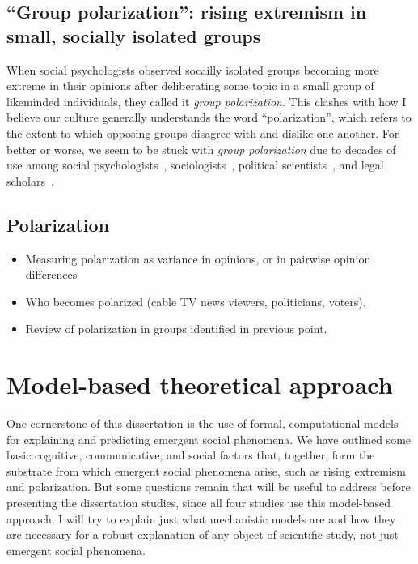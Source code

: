\documentclass[12pt,letterpaper]{article}
\begin{document}
\subsection{``Group polarization'': rising extremism in small, socially isolated groups}

When social psychologists observed socailly isolated groups becoming more extreme
in their opinions after deliberating some topic in a small group of likeminded
individuals, they called it \emph{group polarization}. 
This clashes with how I believe our culture generally understands the word
``polarization'', which refers to the extent to which opposing groups disagree with
and dislike one another. For better or worse, we seem to be stuck with 
\emph{group polarization} due to decades of 
use among social psychologists~\cite{Brown1986,Sieber2019},
sociologists~\cite{Friedkin1999a}, political scientists~\cite{Schkade2010}, and legal scholars~\cite{Sunstein2002}.

\subsection{Polarization}

\begin{itemize}
  \item
    Measuring polarization as variance in opinions, or in pairwise opinion differences
  \item 
    Who becomes polarized (cable TV news viewers, politicians, voters).
  \item
    Review of polarization in groups identified in previous point.
\end{itemize}

\section{Model-based theoretical approach}

One cornerstone of this dissertation is the use of formal, computational models
for explaining and predicting emergent social phenomena. We have outlined
some basic cognitive, communicative, and social factors that, together,
form the substrate from which emergent social phenomena arise, such as rising extremism
and polarization. But some questions remain that will be useful
to address before presenting the dissertation studies, since all four
studies use this model-based approach. I will try to explain 
just what mechanistic models are and how they are necessary for a robust
explanation of any object of scientific study, not just emergent social
phenomena. 
\end{document}
